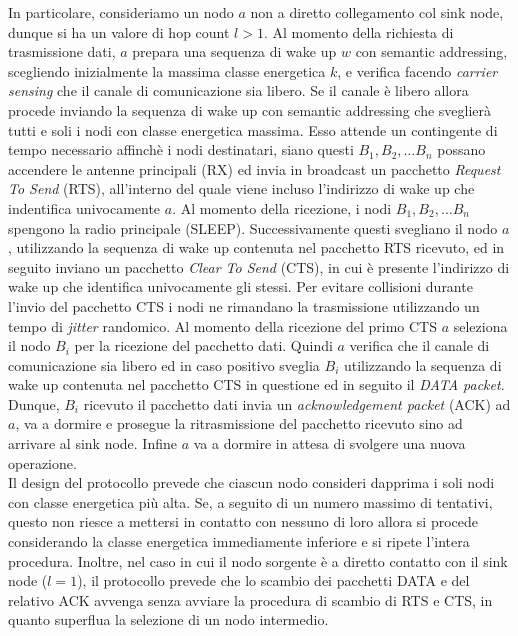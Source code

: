 \documentclass{report}
\begin{document}
In particolare,
consideriamo un nodo $a$ non a diretto collegamento col sink node, dunque si ha un valore di hop count $l>1$. Al momento della richiesta di trasmissione dati,
$a$ prepara una sequenza di wake up $w$ con semantic addressing, scegliendo inizialmente la massima classe energetica $k$, e verifica facendo
\emph{carrier sensing} che il canale di comunicazione sia libero. Se il canale è libero allora procede inviando la sequenza di wake up con semantic addressing
che sveglierà tutti e soli i nodi con classe energetica massima. Esso attende un contingente di tempo necessario affinchè i nodi destinatari, siano
questi $B_1, B_2, \ldots B_n$ possano accendere le antenne principali (RX) ed invia in broadcast un pacchetto \emph{Request To Send} (RTS), all'interno
del quale viene incluso l'indirizzo di wake up che indentifica univocamente $a$. Al momento della ricezione, i nodi $B_1, B_2, \ldots B_n$ spengono la
radio principale (SLEEP). Successivamente questi svegliano il nodo $a$, utilizzando la sequenza di wake up contenuta nel pacchetto RTS ricevuto, ed in
seguito inviano un pacchetto \emph{Clear To Send} (CTS), in cui è presente l'indirizzo di wake up che identifica univocamente gli stessi. Per evitare
collisioni durante l'invio del pacchetto CTS i nodi ne rimandano la trasmissione utilizzando un tempo di \emph{jitter} randomico.
Al momento della ricezione del primo CTS $a$ seleziona il nodo $B_i$ per la ricezione del pacchetto dati. Quindi $a$ verifica che il canale di comunicazione
sia libero ed in caso positivo sveglia $B_i$ utilizzando la sequenza di wake up contenuta nel pacchetto CTS in questione ed in seguito il \emph{DATA packet}.
Dunque, $B_i$ ricevuto il pacchetto dati invia un \emph{acknowledgement packet} (ACK) ad $a$, va a dormire e prosegue la
ritrasmissione del pacchetto ricevuto sino ad arrivare al sink node. Infine $a$ va a dormire in attesa di svolgere una nuova operazione.\\

Il design del protocollo prevede che ciascun nodo consideri dapprima i soli nodi con classe energetica più alta. Se, a seguito di un numero massimo di tentativi,
questo non riesce a mettersi in contatto con nessuno di loro allora si procede considerando la classe energetica immediamente inferiore e si ripete
l'intera procedura. Inoltre, nel caso in cui il nodo sorgente è a diretto contatto con il sink node ($l=1$), il protocollo prevede che
lo scambio dei pacchetti DATA e del relativo ACK avvenga senza avviare la procedura di scambio di RTS e CTS, in quanto superflua la
selezione di un nodo intermedio.\\
\end{document}
